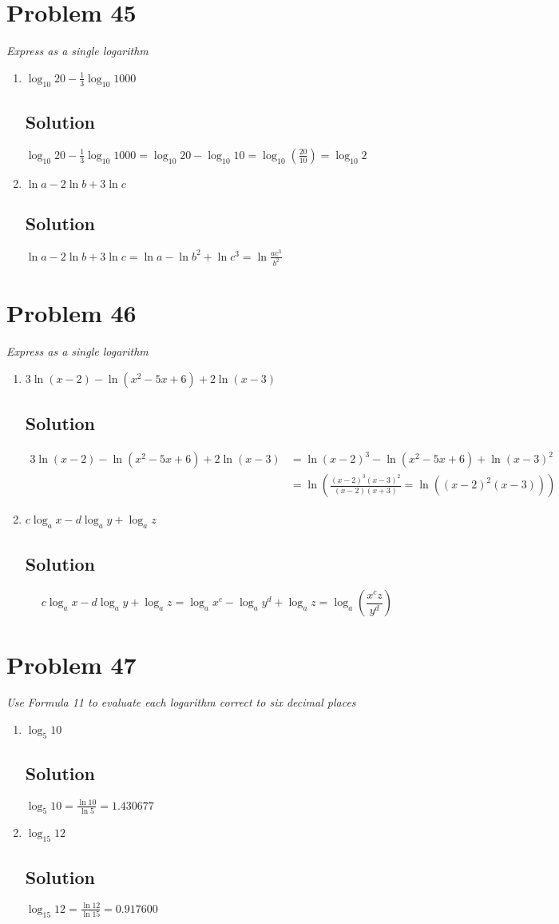 \documentclass[11pt]{article}
\newcommand{\soln}{\subsection*}
\newcommand{\qn}{\textit}
\begin{document}
\section*{Problem 45}

\qn{Express as a single logarithm}
\begin{enumerate}
	\item \qn{$\log_{10}{20} - \frac{1}{3}\log_{10}{1000}$}
	\soln{Solution}
	$\log_{10}{20} - \frac{1}{3}\log_{10}{1000}=\log_{10}{20}-\log_{10}{10}=\log_{10}(\frac{20}{10})=\log_{10}2$
	
	\item \qn{$\ln{a}-2\ln{b}+3\ln{c}$}
	\soln{Solution}
	$\ln{a}-2\ln{b}+3\ln{c}=\ln{a}-\ln{b^2}+\ln{c^3}=\ln{\frac{ac^3}{b^2}}$
\end{enumerate}

\section*{Problem 46}

\qn{Express as a single logarithm}
\begin{enumerate}
	\item \qn{$3\ln(x-2)-\ln(x^2-5x+6)+2\ln(x-3)$}
	\soln{Solution}
	\begin{equation*}
		\begin{aligned}
			3\ln(x-2)-\ln(x^2-5x+6)+2\ln(x-3)&=\ln{(x-2)^3}-\ln(x^2-5x+6)+\ln{(x-3)^2} \\
			&=\ln(\frac{(x-2)^3(x-3)^2}{(x-2)(x+3)}=\ln((x-2)^2(x-3)))
		\end{aligned}
	\end{equation*}
	
	\item \qn{$c\log_a{x}-d\log_a{y}+\log_a{z}$}
	\soln{Solution}
	$$c\log_a{x}-d\log_a{y}+\log_a{z}=\log_a{x^c}-\log_a{y^d}+\log_a{z}=\log_a(\frac{x^cz}{y^d})$$
\end{enumerate}

\section*{Problem 47}

\qn{Use Formula 11 to evaluate each logarithm correct to six decimal places}
\begin{enumerate}
	\item \qn{$\log_5{10}$}
	\soln{Solution}
	$\log_5{10}=\frac{\ln{10}}{\ln{5}}=1.430677$
	
	\item \qn{$\log_{15}{12}$}
	\soln{Solution}
	$\log_{15}{12}=\frac{\ln{12}}{\ln{15}}=0.917600$
\end{enumerate}
\end{document}
